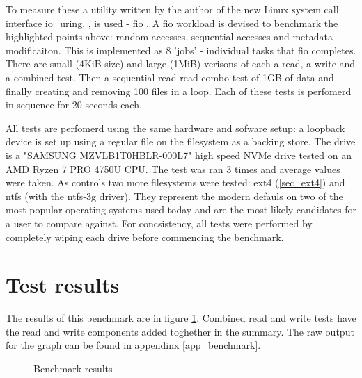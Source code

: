 
        To measure these a utility written by the author of the new Linux
        system call interface io\_uring, \citeauthor{IO_uring}, is used - fio
        \cite{fio}. A fio workload is devised to benchmark the highlighted
        points above: random accesses, sequential accesses and metadata
        modificaiton. This is implemented as 8 'jobs' - individual tasks that
        fio completes. There are small (4KiB size) and large (1MiB) verisons
        of each a read, a write and a combined test. Then a sequential
        read-read combo test of 1GB of data and finally creating and removing
        100 files in a loop. Each of these tests is perfomerd in sequence for
        20 seconds each.

        All tests are perfomerd using the same hardware and sofware setup: a
        loopback device is set up using a regular file on the filesystem as a
        backing store. The drive is a "SAMSUNG MZVLB1T0HBLR-000L7" high speed
        NVMe drive tested on an AMD Ryzen 7 PRO 4750U CPU. The test was ran 3
        times and average values were taken. As controls two more filesystems
        were tested: ext4 (\ref{sec_ext4}) and ntfs (with the ntfs-3g driver).
        They represent the modern defauls on two of the most popular operating
        systems used today and are the most likely candidates for a user to
        compare against. For concsistency, all tests were performed by
        completely wiping each drive before commencing the benchmark.


    \section{Test results}

        The results of this benchmark are in figure \ref{fig_benchmark}.
        Combined read and write tests have the read and write components added
        toghether in the summary. The raw output for the graph can be found in
        appendinx \ref{app_benchmark}.

        \begin{figure}[h!]
            \caption{Benchmark results}
            
            \label{fig_benchmark}
        \end{figure}


